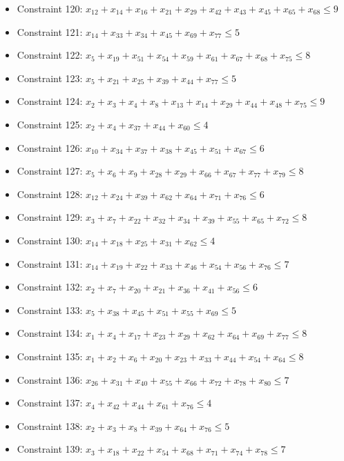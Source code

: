 \documentclass[11pt]{article}
\begin{document}
\begin{itemize}
\item Constraint 120: $x_{12} + x_{14} + x_{16} + x_{21} + x_{29} + x_{42} + x_{43} + x_{45} + x_{65} + x_{68} \le 9$
\item Constraint 121: $x_{14} + x_{33} + x_{34} + x_{45} + x_{69} + x_{77} \le 5$
\item Constraint 122: $x_{5} + x_{19} + x_{51} + x_{54} + x_{59} + x_{61} + x_{67} + x_{68} + x_{75} \le 8$
\item Constraint 123: $x_{5} + x_{21} + x_{25} + x_{39} + x_{44} + x_{77} \le 5$
\item Constraint 124: $x_{2} + x_{3} + x_{4} + x_{8} + x_{13} + x_{14} + x_{29} + x_{44} + x_{48} + x_{75} \le 9$
\item Constraint 125: $x_{2} + x_{4} + x_{37} + x_{44} + x_{60} \le 4$
\item Constraint 126: $x_{10} + x_{34} + x_{37} + x_{38} + x_{45} + x_{51} + x_{67} \le 6$
\item Constraint 127: $x_{5} + x_{6} + x_{9} + x_{28} + x_{29} + x_{66} + x_{67} + x_{77} + x_{79} \le 8$
\item Constraint 128: $x_{12} + x_{24} + x_{39} + x_{62} + x_{64} + x_{71} + x_{76} \le 6$
\item Constraint 129: $x_{3} + x_{7} + x_{22} + x_{32} + x_{34} + x_{39} + x_{55} + x_{65} + x_{72} \le 8$
\item Constraint 130: $x_{14} + x_{18} + x_{25} + x_{31} + x_{62} \le 4$
\item Constraint 131: $x_{14} + x_{19} + x_{22} + x_{33} + x_{46} + x_{54} + x_{56} + x_{76} \le 7$
\item Constraint 132: $x_{2} + x_{7} + x_{20} + x_{21} + x_{36} + x_{41} + x_{56} \le 6$
\item Constraint 133: $x_{5} + x_{38} + x_{45} + x_{51} + x_{55} + x_{69} \le 5$
\item Constraint 134: $x_{1} + x_{4} + x_{17} + x_{23} + x_{29} + x_{62} + x_{64} + x_{69} + x_{77} \le 8$
\item Constraint 135: $x_{1} + x_{2} + x_{6} + x_{20} + x_{23} + x_{33} + x_{44} + x_{54} + x_{64} \le 8$
\item Constraint 136: $x_{26} + x_{31} + x_{40} + x_{55} + x_{66} + x_{72} + x_{78} + x_{80} \le 7$
\item Constraint 137: $x_{4} + x_{42} + x_{44} + x_{61} + x_{76} \le 4$
\item Constraint 138: $x_{2} + x_{3} + x_{8} + x_{39} + x_{64} + x_{76} \le 5$
\item Constraint 139: $x_{3} + x_{18} + x_{22} + x_{54} + x_{68} + x_{71} + x_{74} + x_{78} \le 7$

\end{itemize}
\end{document}
